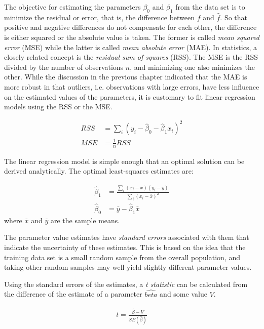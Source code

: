 The objective for estimating the parameters $\beta_0$ and $\beta_1$ from the data set is to minimize the residual or error, that is, the difference between $f$ and $\hat{f}$. So that positive and negative differences do not compensate for each other, the difference is either squared or the absolute value is taken. The former is called \emph{mean squared error} (MSE) while the latter is called \emph{mean absolute error} (MAE). In statistics, a closely related concept is the \emph{residual sum of squares} (RSS). The MSE is the RSS divided by the number of observations $n$, and minimizing one also minimizes the other. While the discussion in the previous chapter indicated that the MAE is more robust in that outliers, i.e. observations with large errors, have less influence on the estimated values of the parameters, it is customary to fit linear regression models using the RSS or the MSE.

\begin{align*}
RSS &= \sum_i \left( y_i - \hat{\beta}_0 - \hat{\beta}_1 x_i \right)^2 \\
MSE &= \frac{1}{n} RSS
\end{align*}

The linear regression model is simple enough that an optimal solution can be derived analytically. The optimal least-squares estimates are:

\begin{align*}
\hat{\beta}_1 &= \frac{\sum_i (x_i - \bar{x})(y_i - \bar{y})} {\sum_i (x_i - \bar{x})^2} \\
\hat{\beta}_0 &= \bar{y} - \hat{\beta}_1 \bar{x}
\end{align*}
\noindent where $\bar{x}$ and $\bar{y}$ are the sample means.

The parameter value estimates have \emph{standard errors} associated with them that indicate the uncertainty of these estimates. This is based on the idea that the training data set is a small random sample from the overall population, and taking other random samples may well yield slightly different parameter values. 

Using the standard errors of the estimates, a \emph{t statistic} can be calculated from the difference of the estimate of a parameter $\hat{beta}$ and some value $V$.

\begin{align*}
t = \frac{\hat{\beta} - V}{SE(\hat{\beta})}
\end{align*}

